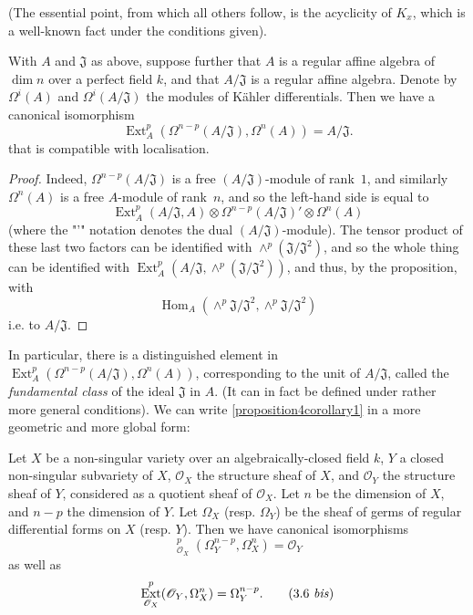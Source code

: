 \documentclass{article}
\theoremstyle{plain}
\newenvironment{corollary}[1]
    {\renewcommand\theinnercustomcorollary{#1}\innercustomcorollary}
    {\endinnercustomcorollary}
\theoremstyle{definition}
\newcommand{\sh}{\mathscr}
\DeclareMathOperator{\Ext}{Ext}
\DeclareMathOperator{\Hom}{Hom}
\DeclareMathOperator{\shExt}{\underline{Ext}}
\newcommand{\oldpage}[1]{\marginpar{\footnotesize$\Big\vert$ \textit{p.~#1}}}
\begin{document}
(The essential point, from which all others follow, is the acyclicity of $K_x$, which is a well-known fact under the conditions given).

\begin{corollary}{1}
\label{proposition4corollary1}
  With $A$ and $\mathfrak{J}$ as above, suppose further that $A$ is a regular affine algebra of $\dim n$ over a perfect field $k$, and that $A/\mathfrak{J}$ is a regular affine algebra.
  Denote by $\Omega^i(A)$ and $\Omega^i(A/\mathfrak{J})$ the modules of K\"{a}hler differentials.
  Then we have a canonical isomorphism
  \[
  \label{3.5}
    \Ext_A^p(\Omega^{n-p}(A/\mathfrak{J}),\Omega^n(A)) = A/\mathfrak{J}.
  \tag{3.5}
  \]
  that is compatible with localisation.
\end{corollary}

\begin{proof}
  Indeed, $\Omega^{n-p}(A/\mathfrak{J})$ is a free $(A/\mathfrak{J})$-module of rank~$1$, and similarly $\Omega^n(A)$ is a free $A$-module of rank~$n$, and so the left-hand side is equal to
  \[
    \Ext_A^p(A/\mathfrak{J},A) \otimes \Omega^{n-p}(A/\mathfrak{J})' \otimes \Omega^n(A)
  \]
  (where the "'" notation denotes the dual $(A/\mathfrak{J})$-module).
  The tensor product of these last two factors can be identified with $\wedge^p(\mathfrak{J}/\mathfrak{J}^2)$, and so the whole thing can be identified with $\Ext_A^p(A/\mathfrak{J},\wedge^p(\mathfrak{J}/\mathfrak{J}^2))$, and thus, by the proposition, with
  \[
    \Hom_A(\wedge^p \mathfrak{J}/\mathfrak{J}^2,\wedge^p \mathfrak{J}/\mathfrak{J}^2)
  \]
  i.e. to $A/\mathfrak{J}$.
\end{proof}

In particular, there is a distinguished element in $\Ext_A^p(\Omega^{n-p}(A/\mathfrak{J}),\Omega^n(A))$, corresponding to the unit of $A/\mathfrak{J}$, called the \emph{fundamental class} of the ideal $\mathfrak{J}$ in $A$.
(It can in fact be defined under rather more general conditions).
We can write \cref{proposition4corollary1} in a more geometric and more global form:

\begin{corollary}{2}
\label{proposition4corollary2}
  Let $X$ be a non-singular variety over an algebraically-closed field $k$, $Y$ a closed non-singular subvariety of $X$, $\sh{O}_X$ the structure sheaf of $X$, and $\sh{O}_Y$ the structure sheaf of $Y$, considered as a quotient sheaf of $\sh{O}_X$.
  Let $n$ be the dimension of $X$, and $n-p$ the dimension of $Y$.
\oldpage{149-08}
  Let $\Omega_X$ (resp. $\Omega_Y$) be the sheaf of germs of regular differential forms on $X$ (resp. $Y$).
  Then we have canonical isomorphisms
  \[
  \label{3.6}
    \shExt_{\sh{O}_X}^p(\Omega_Y^{n-p},\Omega_X^n) = \sh{O}_Y
  \tag{3.6}
  \]
  as well as
  \[
  \label{3.6bis}
    \Ext_{\sh{O}_X}^p(\sh{O}_Y,\Omega_X^n) = \Omega_Y^{n-p}.
  \tag{3.6 \emph{bis}}
  \]
\end{corollary}
\end{document}

